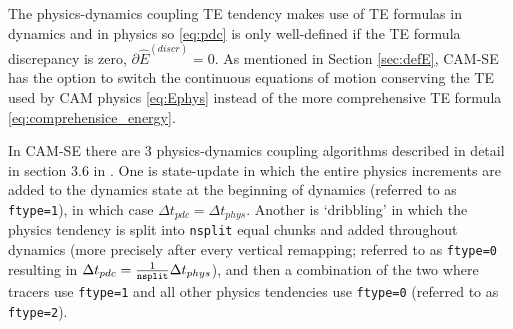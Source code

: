 \documentclass{agujournal}
\newcommand*{\gi}[1]{\widehat{#1}}
\begin{document}
\begin{enumerate}
\begin{itemize}
The physics-dynamics coupling TE tendency makes use of TE formulas in dynamics and in physics so \eqref{eq:pdc} is only well-defined if the TE formula discrepancy is zero, $\partial \gi{E}^{({discr})}=0$. As mentioned in Section \ref{sec:defE}, CAM-SE has the option to switch the continuous equations of motion conserving the TE used by CAM physics \eqref{eq:Ephys} instead of the more comprehensive TE formula \eqref{eq:comprehensice_energy}.

In CAM-SE there are 3 physics-dynamics coupling algorithms described in detail in section 3.6 in \citet{LetAl2018JAMES}. One is state-update in which the entire physics increments are added to the dynamics state at the beginning of dynamics (referred to as {\tt{ftype=1}}), in which case $\Delta t_{pdc}=\Delta t_{phys}$. Another is `dribbling' in which the physics tendency is split into {\tt{nsplit}} equal chunks and added throughout dynamics (more precisely after every vertical remapping; referred to as {\tt{ftype=0}} resulting in $\Delta t_{pdc}=\frac{1}{{\tt{nsplit}}}\Delta t_{phys}$), and then a combination of the two where tracers use  {\tt{ftype=1}} and all other physics tendencies use  {\tt{ftype=0}} (referred to as {\tt{ftype=2}}). 

\end{itemize}
\end{enumerate}
\end{document}
